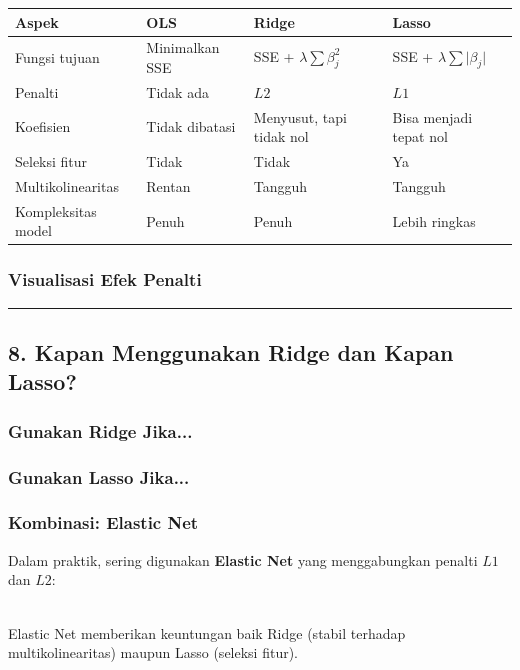 \documentclass[12pt,a4paper]{article}
\begin{document}
\begin{tabular}{|l|l|l|l|}
\hline
Aspek & OLS & Ridge & Lasso \\
\hline
Fungsi tujuan & Minimalkan SSE & SSE + $\lambda \sum \beta_j^2$ & SSE + $\lambda \sum \lvert \beta_j \rvert$ \\
\hline
Penalti & Tidak ada & $L2$ & $L1$ \\
\hline
Koefisien & Tidak dibatasi & Menyusut, tapi tidak nol & Bisa menjadi tepat nol \\
\hline
Seleksi fitur & Tidak & Tidak & Ya \\
\hline
Multikolinearitas & Rentan & Tangguh & Tangguh \\
\hline
Kompleksitas model & Penuh & Penuh & Lebih ringkas \\
\hline
\end{tabular}


\subsubsection{Visualisasi Efek Penalti}


\hrule


\subsection{8. Kapan Menggunakan Ridge dan Kapan Lasso?}

\subsubsection{Gunakan Ridge Jika...}


\subsubsection{Gunakan Lasso Jika...}


\subsubsection{Kombinasi: Elastic Net}

Dalam praktik, sering digunakan \textbf{Elastic Net} yang menggabungkan penalti $L1$ dan $L2$:


\\[
\min_{\beta} \sum_{i=1}^{n} (y_i - \hat{y}_i)^2 + \lambda_1 \sum_{j=1}^{p} \lvert \beta_j \rvert  + \lambda_2 \sum_{j=1}^{p} \beta_j^2
\\]


Elastic Net memberikan keuntungan baik Ridge (stabil terhadap multikolinearitas) maupun Lasso (seleksi fitur).
\end{document}
